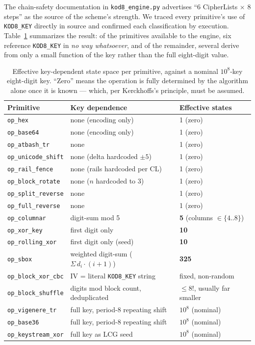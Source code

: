 \documentclass[11pt]{article}
\begin{document}
The chain-safety documentation in \texttt{kod8\_engine.py} advertises
``6 CipherLists $\times$ 8 steps'' as the source of the scheme's
strength. We traced every primitive's use of \texttt{KOD8\_KEY} directly
in source and confirmed each classification by execution. Table~\ref{tab:entropy}
summarizes the result: of the primitives available to the engine, six
reference \texttt{KOD8\_KEY} in \emph{no way whatsoever}, and of the
remainder, several derive from only a small function of the key rather
than the full eight-digit value.

\begin{table}[h]
\centering
\small
\caption{Effective key-dependent state space per primitive, against a
nominal $10^{8}$-key eight-digit key. ``Zero'' means the operation is
fully determined by the algorithm alone once it is known — which,
per Kerckhoffs's principle, must be assumed.}
\label{tab:entropy}
\begin{tabular}{@{}lll@{}}
\toprule
\textbf{Primitive} & \textbf{Key dependence} & \textbf{Effective states} \\
\midrule
\texttt{op\_hex}          & none (encoding only)         & 1 (zero) \\
\texttt{op\_base64}       & none (encoding only)         & 1 (zero) \\
\texttt{op\_atbash\_tr}   & none                          & 1 (zero) \\
\texttt{op\_unicode\_shift} & none (delta hardcoded $\pm5$) & 1 (zero) \\
\texttt{op\_rail\_fence}  & none (rails hardcoded per CL) & 1 (zero) \\
\texttt{op\_block\_rotate} & none ($n$ hardcoded to 3)    & 1 (zero) \\
\texttt{op\_split\_reverse} & none                        & 1 (zero) \\
\texttt{op\_full\_reverse} & none                          & 1 (zero) \\
\texttt{op\_columnar}     & digit-sum mod 5 & \textbf{5} (columns $\in\{4..8\}$) \\
\texttt{op\_xor\_key}     & first digit only              & \textbf{10} \\
\texttt{op\_rolling\_xor} & first digit only (seed)       & \textbf{10} \\
\texttt{op\_sbox}         & weighted digit-sum ($\Sigma\, d_i \! \cdot\! (i{+}1)$) & \textbf{325} \\
\texttt{op\_block\_xor\_cbc} & IV = literal \texttt{KOD8\_KEY} string & fixed, non-random \\
\texttt{op\_block\_shuffle} & digits mod block count, deduplicated & $\le 8!$, usually far smaller \\
\texttt{op\_vigenere\_tr} & full key, period-8 repeating shift & $10^{8}$ (nominal) \\
\texttt{op\_base36}       & full key, period-8 repeating shift & $10^{8}$ (nominal) \\
\texttt{op\_keystream\_xor} & full key as LCG seed          & $10^{8}$ (nominal) \\
\bottomrule
\end{tabular}
\end{table}
\end{document}
